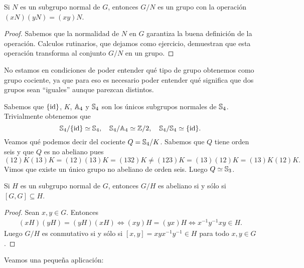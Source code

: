 \begin{theorem}
\label{Grupo!cociente}
Si $N$ es un subgrupo normal de $G$, entonces $G/N$ es un grupo con la operación $(xN)(yN)=(xy)N$.  
\end{theorem}

\begin{proof}
Sabemos que la normalidad de $N$ en $G$ garantiza la buena definición de la operación. Calculos rutinarios, que dejamos como ejercicio, demuestran que 
esta operación transforma al conjunto $G/N$ en un grupo. 
\end{proof}

No estamos en condiciones de poder entender qué tipo de grupo obtenemos
como grupo cociente, ya que para eso es necesario poder entender qué significa 
que dos grupos sean ``iguales'' aunque parezcan distintos. 
 
\begin{example}
	Sabemos que $\{\operatorname{id}\}$, $K$, $\mathbb{A}_4$ y $\mathbb{S}_4$ son los únicos subgrupos normales de $\mathbb{S}_4$. Trivialmente 
	obtenemos que
	\[
	\mathbb{S}_4/\{\operatorname{id}\}\simeq\mathbb{S}_4,\quad
	\mathbb{S}_4/\mathbb{A}_4\simeq\mathbb{Z}/2,\quad
	\mathbb{S}_4/\mathbb{S}_4\simeq\{\operatorname{id}\}.
	\]
	Veamos qué podemos decir del cociente $Q=\mathbb{S}_4/K$. Sabemos que $Q$ tiene orden seis y que $Q$ es no abeliano pues
	\[
	(12)K(13)K=(12)(13)K=(132)K\ne (123)K=(13)(12)K=(13)K(12)K.
	\]
	Vimos que existe un único grupo no abeliano de orden seis. Luego $Q\simeq\mathbb{S}_3$. 
\end{example}


\begin{proposition}
Si $H$ es un subgrupo normal de $G$, entonces $G/H$ es abeliano si y sólo si $[G,G]\subseteq H$. 
\end{proposition}

\begin{proof}
Sean $x,y\in G$. Entonces 
\begin{align*}
    (xH)(yH)=(yH)(xH) \Longleftrightarrow (xy)H=(yx)H \Longleftrightarrow x^{-1}y^{-1}xy\in H.
\end{align*}
Luego $G/H$ es conmutativo si y sólo si $[x,y]=xyx^{-1}y^{-1}\in H$ para todo $x,y\in G$. 
\end{proof}

Veamos una pequeña aplicación:

